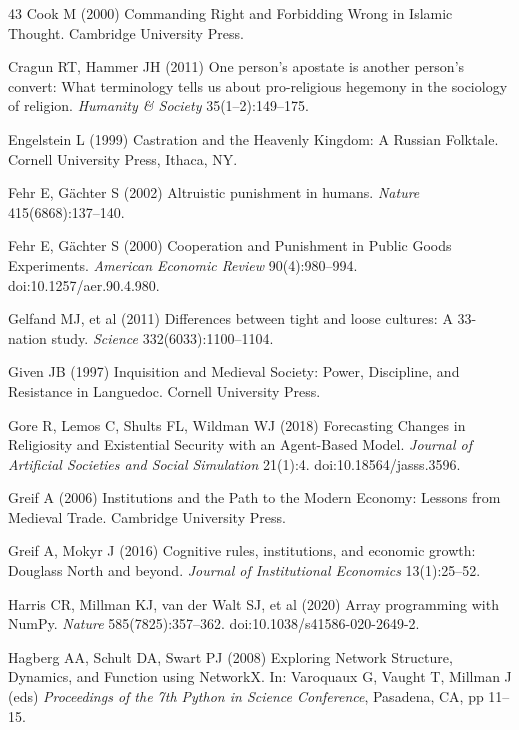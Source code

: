 \documentclass[12pt]{article}
\begin{document}
\begin{thebibliography}{43}
Cook M (2000) Commanding Right and Forbidding Wrong in Islamic Thought. Cambridge University Press.

Cragun RT, Hammer JH (2011) One person's apostate is another person's convert: What terminology tells us about pro-religious hegemony in the sociology of religion. \textit{Humanity \& Society} 35(1--2):149--175.

Engelstein L (1999) Castration and the Heavenly Kingdom: A Russian Folktale. Cornell University Press, Ithaca, NY.

Fehr E, G\"achter S (2002) Altruistic punishment in humans. \textit{Nature} 415(6868):137--140.

Fehr E, G\"{a}chter S (2000) Cooperation and Punishment in Public Goods Experiments. \textit{American Economic Review} 90(4):980--994. doi:10.1257/aer.90.4.980.

Gelfand MJ, et al (2011) Differences between tight and loose cultures: A 33-nation study. \textit{Science} 332(6033):1100--1104.

Given JB (1997) Inquisition and Medieval Society: Power, Discipline, and Resistance in Languedoc. Cornell University Press.

Gore R, Lemos C, Shults FL, Wildman WJ (2018) Forecasting Changes in Religiosity and Existential Security with an Agent-Based Model. \textit{Journal of Artificial Societies and Social Simulation} 21(1):4. doi:10.18564/jasss.3596.

Greif A (2006) Institutions and the Path to the Modern Economy: Lessons from Medieval Trade. Cambridge University Press.

Greif A, Mokyr J (2016) Cognitive rules, institutions, and economic growth: Douglass North and beyond. \textit{Journal of Institutional Economics} 13(1):25--52.

Harris CR, Millman KJ, van der Walt SJ, et al (2020) Array programming with NumPy. \textit{Nature} 585(7825):357--362. doi:10.1038/s41586-020-2649-2.

Hagberg AA, Schult DA, Swart PJ (2008) Exploring Network Structure, Dynamics, and Function using NetworkX. In: Varoquaux G, Vaught T, Millman J (eds) \textit{Proceedings of the 7th Python in Science Conference}, Pasadena, CA, pp 11--15.


\end{thebibliography}
\end{document}
